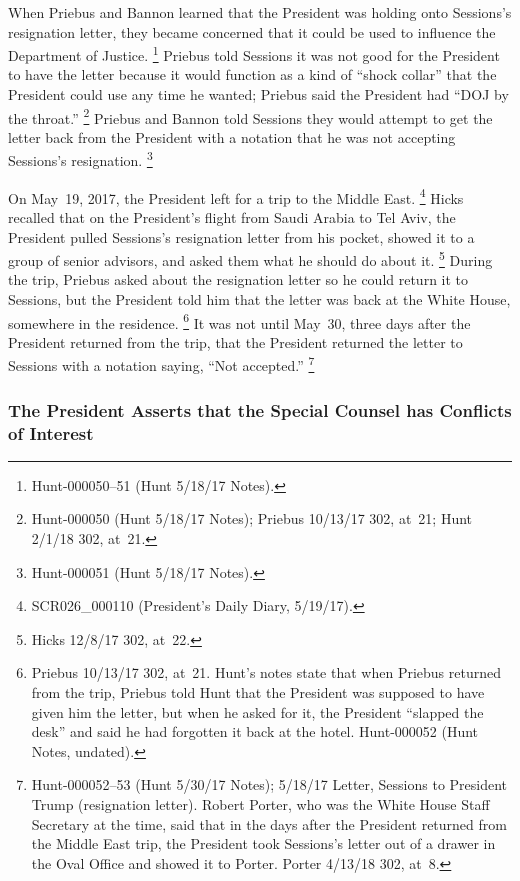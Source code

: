 When Priebus and Bannon learned that the President was holding onto Sessions's resignation letter, they became concerned that it could be used to influence the Department of Justice.%
\footnote{Hunt-000050--51 (Hunt 5/18/17 Notes).}
Priebus told Sessions it was not good for the President to have the letter because it would function as a kind of ``shock collar'' that the President could use any time he wanted;
Priebus said the President had ``DOJ by the throat.''%
\footnote{Hunt-000050 (Hunt 5/18/17 Notes);
Priebus 10/13/17 302, at~21;
Hunt 2/1/18 302, at~21.}
Priebus and Bannon told Sessions they would attempt to get the letter back from the President with a notation that he was not accepting Sessions's resignation.%
\footnote{Hunt-000051 (Hunt 5/18/17 Notes).}

On May~19, 2017, the President left for a trip to the Middle East.%
\footnote{SCR026\_000110 (President's Daily Diary, 5/19/17).}
Hicks recalled that on the President's flight from Saudi Arabia to Tel Aviv, the President pulled Sessions's resignation letter from his pocket, showed it to a group of senior advisors, and asked them what he should do about it.%
\footnote{Hicks 12/8/17 302, at~22.}
During the trip, Priebus asked about the resignation letter so he could return it to Sessions, but the President told him that the letter was back at the White House, somewhere in the residence.%
\footnote{Priebus 10/13/17 302, at~21.
Hunt's notes state that when Priebus returned from the trip, Priebus told Hunt that the President was supposed to have given him the letter, but when he asked for it, the President ``slapped the desk'' and said he had forgotten it back at the hotel.
Hunt-000052 (Hunt Notes, undated).}
It was not until May~30, three days after the President returned from the trip, that the President returned the letter to Sessions with a notation saying, ``Not accepted.''%
\footnote{Hunt-000052--53 (Hunt 5/30/17 Notes);
5/18/17 Letter, Sessions to President Trump (resignation letter).
Robert Porter, who was the White House Staff Secretary at the time, said that in the days after the President returned from the Middle East trip, the President took Sessions's letter out of a drawer in the Oval Office and showed it to Porter.
Porter 4/13/18 302, at~8.
}

\subsubsection{The President Asserts that the Special Counsel has Conflicts of Interest}

